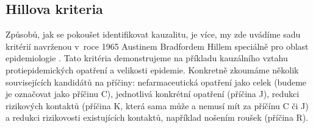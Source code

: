 
\subsection*{Hillova kriteria}

Způsobů, jak se pokoušet identifikovat kauzalitu, je více,
my zde uvádíme sadu kritérií navrženou v~roce 1965 Austinem Bradfordem Hillem
speciálně pro oblast epidemiologie \cite{hill1965environment}. Tato kritéria demonstrujeme na příkladu kauzálního vztahu protiepidemických opatření a velikosti epidemie. Konkretně zkoumáme několik souvisejících kandidátů na příčiny: nefarmaceutická opatření jako celek (budeme je označovat jako příčinu C),
jednotlivá konkrétní opatření (příčina J), redukci rizikových
kontaktů (příčina K, která sama může a nemusí mít za příčínu C či
J) a redukci rizikovosti existujících kontaktů, například nošením roušek (příčina
R). 

